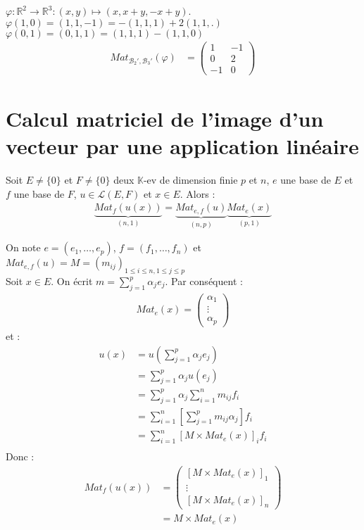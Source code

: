 \documentclass[../main.tex]{subfiles}
\begin{document}
\noindent $\varphi:\mathbb{R}^2\to \mathbb{R}^3:(x,y)\mapsto (x, x+y, -x+y)$. \\
$\varphi(1, 0) = (1, 1, -1) = -(1, 1, 1) + 2(1, 1, .)$ \\
$\varphi(0, 1) = (0, 1, 1) = (1, 1, 1) - (1, 1, 0)$ \\
\begin{align*}
    Mat_{\mathcal{B}_2', \mathcal{B}_3'}(\varphi) &= \begin{pmatrix}
        1 & -1 \\
        0 & 2 \\
        -1 & 0
    \end{pmatrix}
\end{align*}

\section{Calcul matriciel de l'image d'un vecteur par une application linéaire}
\begin{tcolorbox}[title=Théorème 28.19, title filled=false, colframe=orange, colback=orange!10!white]
    Soit $E\neq \{0\}$ et $F\neq \{0\}$ deux $\mathbb{K}$-ev de dimension finie $p$ et $n$, $e$ une base de $E$ et $f$ une base de $F$, $u\in \mathcal{L}(E, F)$ et $x\in E$. Alors : 
    \begin{align*}
        \underbrace{Mat_f(u(x))}_{(n,1)} = \underbrace{Mat_{e,f}(u)}_{(n,p)} \underbrace{Mat_e(x)}_{(p,1)}
    \end{align*}
\end{tcolorbox}

\noindent On note $e = (e_1, \ldots, e_p)$, $f = (f_1, \ldots, f_n)$ et $Mat_{e,f}(u) = M = (m_{ij})_{1\leq i\leq n, 1\leq j\leq p}$ \\
Soit $x\in E$. On écrit $m = \sum\limits_{j=1}^{p} \alpha_j e_j$. Par conséquent : \begin{align*}
    Mat_e(x) = \begin{pmatrix}
    \alpha_1 \\
    \vdots \\
    \alpha_p
\end{pmatrix}
\end{align*}
et :
\begin{align*}
    u(x) &= u(\sum_{j=1}^{p} \alpha_j e_j) \\
    &= \sum_{j=1}^{p} \alpha_j u(e_j) \\
    &= \sum_{j=1}^{p} \alpha_j \sum_{i=1}^{n} m_{ij} f_i \\
    &= \sum_{i=1}^{n} \left[ \sum_{j=1}^{p} m_{ij} \alpha_j \right] f_i \\
    &= \sum_{i=1}^{n} [M\times Mat_e(x)]_i f_i \\
\end{align*}
Donc : 
\begin{align*}
    Mat_f(u(x)) &= \begin{pmatrix}
        [M\times Mat_e(x)]_1 \\
        \vdots \\
        [M\times Mat_e(x)]_n
    \end{pmatrix} \\
    &= M \times Mat_e(x)
\end{align*}
\end{document}
